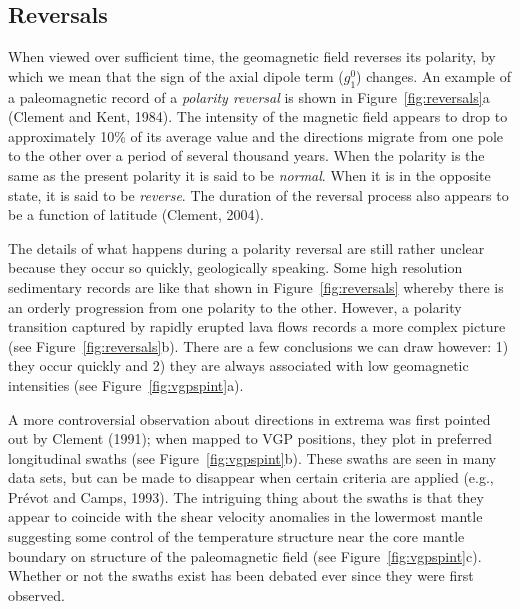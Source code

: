 \subsection{Reversals}
\label{sect:trans}


When viewed over sufficient time, the geomagnetic field 
reverses its polarity, by which we mean
that  the sign of the axial dipole term ($g_1^0$) changes.
An example of a paleomagnetic record of a 
{\it polarity reversal}  is shown in
Figure~\ref{fig:reversals}a 
(Clement and Kent, 1984).  \nocite{clement84}
The intensity of the magnetic field appears to drop to
approximately 10\% of its average value and the directions migrate from
one pole to the other over a period of several thousand years.   When the polarity is the same as the present polarity it is said to be {\it
normal}.
When it is in the opposite state, it is said to be
{\it reverse}.   The duration of the reversal process also appears to be a function of latitude
 \nocite{clement04}
 (Clement, 2004).



The details of what happens during a polarity reversal are still rather unclear because they occur so quickly, geologically speaking.   Some high resolution sedimentary records are like that shown in Figure~\ref{fig:reversals} whereby there is an orderly progression from one polarity to the other.  However, a  polarity transition captured by rapidly erupted lava flows records  a more complex picture (see Figure~\ref{fig:reversals}b).   There are a few conclusions we can draw however:  1) they occur quickly and 2) they are always associated with low geomagnetic intensities (see Figure~\ref{fig:vgpspint}a).    

A more controversial observation about directions in extrema was first pointed out by Clement (1991); when mapped to VGP positions, they plot in preferred longitudinal swaths (see Figure~\ref{fig:vgpspint}b).  These swaths are seen in many data sets, but can be made to disappear when certain criteria are applied (e.g., Pr\'evot and Camps, 1993).  The intriguing thing about the swaths is that they appear to coincide with the shear velocity anomalies in the lowermost mantle suggesting some control of the temperature structure near the core mantle boundary on structure of the paleomagnetic field  (see Figure~\ref{fig:vgpspint}c).   Whether or not the swaths exist has been debated ever since they were first observed.  




